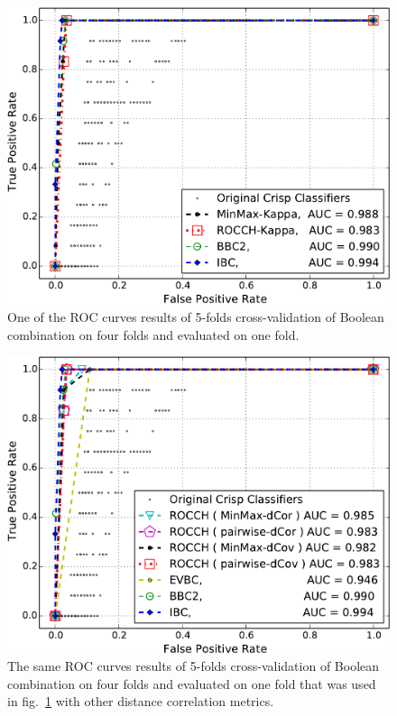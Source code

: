 
\begin{figure}[t]
\centering
\includegraphics[width=\columnwidth]{figs/roc_curves_training_on_4_folds_testing_on_1-crop}
\caption{One of the ROC curves results of 5-folds cross-validation of Boolean combination on four folds and evaluated on one fold.}
\label{fig:roc_curves4}
\end{figure}

\begin{figure}[t]
\centering
\includegraphics[width=\columnwidth]{figs/ADFA-dcov/IBC_BCC_Pruned_Classifier_ConvexHull_withoutRandom_validation_4fold}
\caption{The same ROC curves results of 5-folds cross-validation of Boolean combination on four folds and evaluated on one fold that was used in fig.~\ref{fig:roc_curves4} with other distance correlation metrics.}
\label{fig:roc_curves4_dcov}
\end{figure}





